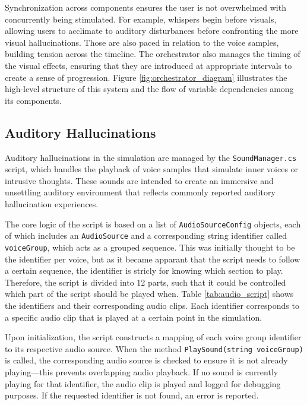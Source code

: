 Synchronization across components ensures the user is not overwhelmed with concurrently being stimulated. For example, whispers begin before visuals, allowing users to acclimate to auditory disturbances before confronting the more visual hallucinations. Those are also paced in relation to the voice samples, building tension across the timeline.
The orchestrator also manages the timing of the visual effects, ensuring that they are introduced at appropriate intervals to create a sense of progression. Figure \ref{fig:orchestrator_diagram} illustrates the high-level structure of this system and the flow of variable dependencies among its components.

\subsection{Auditory Hallucinations}

Auditory hallucinations in the simulation are managed by the \texttt{SoundManager.cs} script, which handles the playback of voice samples that simulate inner voices or intrusive thoughts. These sounds are intended to create an immersive and unsettling auditory environment that reflects commonly reported auditory hallucination experiences.

\vspace{1em}

The core logic of the script is based on a list of \texttt{AudioSourceConfig} objects, each of which includes an \texttt{AudioSource} and a corresponding string identifier called \texttt{voiceGroup}, which acts as a grouped sequence. This was initially thought to be the identifier per voice, but as it became apparant that the script needs to follow a certain sequence, the identifier is stricly for knowing which section to play. Therefore, the script is divided into 12 parts, such that it could be controlled which part of the script should be played when. Table \ref{tab:audio_script} shows the identifiers and their corresponding audio clips. Each identifier corresponds to a specific audio clip that is played at a certain point in the simulation.

Upon initialization, the script constructs a mapping of each voice group identifier to its respective audio source. When the method \texttt{PlaySound(string voiceGroup)} is called, the corresponding audio source is checked to ensure it is not already playing—this prevents overlapping audio playback. If no sound is currently playing for that identifier, the audio clip is played and logged for debugging purposes. If the requested identifier is not found, an error is reported.

